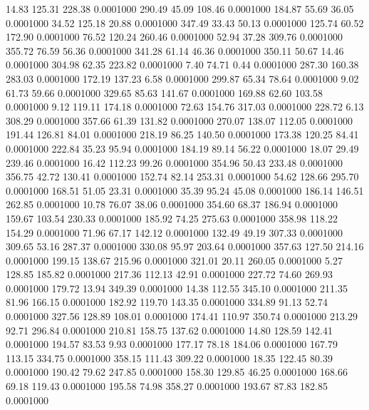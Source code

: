   14.83  125.31  228.38   0.0001000
 290.49   45.09  108.46   0.0001000
 184.87   55.69   36.05   0.0001000
  34.52  125.18   20.88   0.0001000
 347.49   33.43   50.13   0.0001000
 125.74   60.52  172.90   0.0001000
  76.52  120.24  260.46   0.0001000
  52.94   37.28  309.76   0.0001000
 355.72   76.59   56.36   0.0001000
 341.28   61.14   46.36   0.0001000
 350.11   50.67   14.46   0.0001000
 304.98   62.35  223.82   0.0001000
   7.40   74.71    0.44   0.0001000
 287.30  160.38  283.03   0.0001000
 172.19  137.23    6.58   0.0001000
 299.87   65.34   78.64   0.0001000
   9.02   61.73   59.66   0.0001000
 329.65   85.63  141.67   0.0001000
 169.88   62.60  103.58   0.0001000
   9.12  119.11  174.18   0.0001000
  72.63  154.76  317.03   0.0001000
 228.72    6.13  308.29   0.0001000
 357.66   61.39  131.82   0.0001000
 270.07  138.07  112.05   0.0001000
 191.44  126.81   84.01   0.0001000
 218.19   86.25  140.50   0.0001000
 173.38  120.25   84.41   0.0001000
 222.84   35.23   95.94   0.0001000
 184.19   89.14   56.22   0.0001000
  18.07   29.49  239.46   0.0001000
  16.42  112.23   99.26   0.0001000
 354.96   50.43  233.48   0.0001000
 356.75   42.72  130.41   0.0001000
 152.74   82.14  253.31   0.0001000
  54.62  128.66  295.70   0.0001000
 168.51   51.05   23.31   0.0001000
  35.39   95.24   45.08   0.0001000
 186.14  146.51  262.85   0.0001000
  10.78   76.07   38.06   0.0001000
 354.60   68.37  186.94   0.0001000
 159.67  103.54  230.33   0.0001000
 185.92   74.25  275.63   0.0001000
 358.98  118.22  154.29   0.0001000
  71.96   67.17  142.12   0.0001000
 132.49   49.19  307.33   0.0001000
 309.65   53.16  287.37   0.0001000
 330.08   95.97  203.64   0.0001000
 357.63  127.50  214.16   0.0001000
 199.15  138.67  215.96   0.0001000
 321.01   20.11  260.05   0.0001000
   5.27  128.85  185.82   0.0001000
 217.36  112.13   42.91   0.0001000
 227.72   74.60  269.93   0.0001000
 179.72   13.94  349.39   0.0001000
  14.38  112.55  345.10   0.0001000
 211.35   81.96  166.15   0.0001000
 182.92  119.70  143.35   0.0001000
 334.89   91.13   52.74   0.0001000
 327.56  128.89  108.01   0.0001000
 174.41  110.97  350.74   0.0001000
 213.29   92.71  296.84   0.0001000
 210.81  158.75  137.62   0.0001000
  14.80  128.59  142.41   0.0001000
 194.57   83.53    9.93   0.0001000
 177.17   78.18  184.06   0.0001000
 167.79  113.15  334.75   0.0001000
 358.15  111.43  309.22   0.0001000
  18.35  122.45   80.39   0.0001000
 190.42   79.62  247.85   0.0001000
 158.30  129.85   46.25   0.0001000
 168.66   69.18  119.43   0.0001000
 195.58   74.98  358.27   0.0001000
 193.67   87.83  182.85   0.0001000
